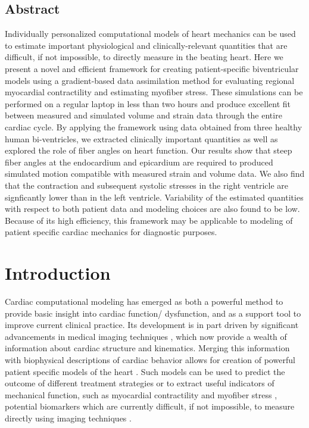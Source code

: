 \subsection*{Abstract}
Individually personalized computational models of
  heart mechanics can be used to estimate important physiological and
  clinically-relevant quantities that are difficult, if not
  impossible, to directly measure in the beating heart. Here we present a novel
  and efficient framework for creating patient-specific biventricular
  models using a gradient-based data assimilation method for evaluating regional myocardial
  contractility and estimating myofiber stress. These
  simulations can be performed on a regular laptop in less than two
  hours and produce excellent fit between measured and simulated
  volume and strain data through the entire cardiac cycle. By applying
  the framework using data obtained from three healthy human
  bi-ventricles, we extracted clinically important quantities as well as
  explored the role of fiber angles on heart function. Our results
  show that steep fiber angles at the endocardium and epicardium
  are required to produced simulated motion compatible with measured strain and volume data. We also
  find that the contraction and subsequent systolic stresses in the right ventricle
  are signficantly lower than in the left ventricle. Variability of the
  estimated quantities with respect to both patient data and modeling choices are also found
  to be low. Because of its high efficiency, this framework may be
  applicable to modeling of patient specific cardiac mechanics for
  diagnostic purposes.


\section{Introduction}
Cardiac computational modeling has emerged as both a powerful method to provide basic insight into cardiac function/
dysfunction, and as a support tool to improve current clinical practice. Its development
is in part driven by significant advancements in medical imaging techniques
\citep{pope2008three,townsend2008multimodality,lamata2014images}, which now provide a
wealth of information about cardiac structure and
kinematics. Merging this information with biophysical descriptions of
cardiac behavior allows for creation of powerful patient specific models
of the heart \citep{Krishnamurthy2013, Lee2014JCS, chabiniok2016multiphysics}. Such models can
 be used to predict the outcome of different treatment
strategies \citep{sermesant2012patient} or to extract
 useful indicators of mechanical function,  such as myocardial contractility
\citep{chabiniok2012estimation,finsberg2017estimating} and
myofiber stress \citep{genet2014distribution,xi2016patient}, potential biomarkers which are
currently difficult, if not impossible, to measure directly using imaging
techniques \citep{huisman1980measurement}.


